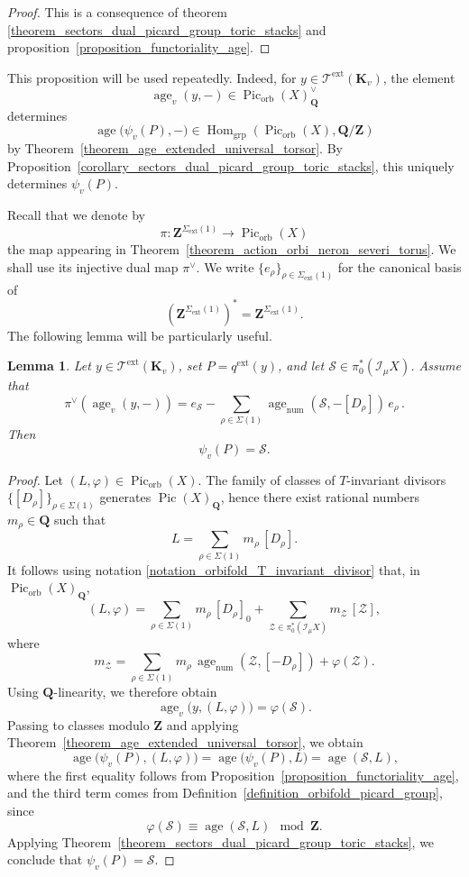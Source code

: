 \documentclass{proc-l}
\newcommand{\Z}{\mathbf{Z}}
\newcommand{\K}{\mathbf{K}}
\newcommand{\Q}{\mathbf{Q}}
\DeclareMathOperator{\Pic}{Pic}
\DeclareMathOperator{\grp}{grp}
\DeclareMathOperator{\Hom}{Hom}
\DeclareMathOperator{\num}{num}
\DeclareMathOperator{\age}{age}
\DeclareMathOperator{\orb}{orb}
\DeclareMathOperator{\ext}{ext}
\newcommand{\stackZ}{\mathcal{Z}}
\newcommand{\stackS}{\mathcal{S}}
\newcommand{\stackT}{\mathcal{T}}
\newcommand{\sheafI}{\mathcal{I}}
\newcommand{\twistsector}{\pi_0^*(\sheafI_{\mu} X)}
\newtheorem{lemma}[theorem]{Lemma}
\theoremstyle{definition}
\theoremstyle{remark}
\numberwithin{equation}{section}
\begin{document}
\begin{proof}
This is a consequence of theorem
\ref{theorem_sectors_dual_picard_group_toric_stacks} and proposition~\ref{proposition_functoriality_age}.
\end{proof}

This proposition will be used repeatedly. Indeed, for
$y \in \stackT^{\ext}(\K_v)$, the element
\[
\age_v(y,-) \in \Pic_{\orb}(X)^{\vee}_{\Q}
\]
determines
\[
\age\bigl(\psi_v(P),-\bigr) \in \Hom_{\grp}\!\left(\Pic_{\orb}(X), \Q / \Z\right)
\]
by Theorem~\ref{theorem_age_extended_universal_torsor}. By
Proposition~\ref{corollary_sectors_dual_picard_group_toric_stacks}, this uniquely
determines $\psi_v(P)$.

Recall that we denote by
\[
\pi : \Z^{\Sigma_{\ext}(1)} \longrightarrow \Pic_{\orb}(X)
\]
the map appearing in Theorem~\ref{theorem_action_orbi_neron_severi_torus}. We shall use
its injective dual map $\pi^{\vee}$. We write
$\{e_{\rho}\}_{\rho \in \Sigma_{\ext}(1)}$ for the canonical basis of
\[
(\Z^{\Sigma_{\ext}(1)})^{*} = \Z^{\Sigma_{\ext}(1)}.
\]
The following lemma will be particularly useful.

\begin{lemma}\label{lemma_computation_residue_map}
Let $y \in \stackT^{\ext}(\K_v)$, set $P = q^{\ext}(y)$, and let
$\stackS \in \twistsector$. Assume that
\[
\pi^{\vee}(\age_v(y,-))
= e_{\stackS} -
\sum_{\rho \in \Sigma(1)}
\age_{\num}\!\left(\stackS,-[D_{\rho}]\right)\, e_{\rho} \, .
\]
Then
\[
\psi_v(P) = \stackS .
\]
\end{lemma}


\begin{proof}
Let $(L,\varphi) \in \Pic_{\orb}(X)$. The family of classes of $T$-invariant divisors
$\{[D_{\rho}]\}_{\rho \in \Sigma(1)}$ generates $\Pic(X)_{\Q}$, hence there exist
rational numbers $m_{\rho} \in \Q$ such that
\[
L = \sum_{\rho \in \Sigma(1)} m_{\rho}\,[D_{\rho}].
\]
It follows using notation \ref{notation_orbifold_T_invariant_divisor} that, in $\Pic_{\orb}(X)_{\Q}$,
\[
(L,\varphi)
=
\sum_{\rho \in \Sigma(1)} m_{\rho}\,[D_{\rho}]_{0}
+
\sum_{\stackZ \in \twistsector} m_{\stackZ}\,[\stackZ],
\]
where
\[
m_{\stackZ}
=
\sum_{\rho \in \Sigma(1)}
m_{\rho}\,
\age_{\num}\!\left(\stackZ,[-D_{\rho}]\right)
+
\varphi(\stackZ).
\]
Using $\Q$-linearity, we therefore obtain
\begin{equation}\label{equation_lemma_computation_residue_map}
\age_v\bigl(y,(L,\varphi)\bigr) = \varphi(\stackS).    
\end{equation}Passing to classes modulo $\Z$ and applying
Theorem~\ref{theorem_age_extended_universal_torsor}, we obtain
\[
\age\bigl(\psi_v(P),(L,\varphi)\bigr)
=
\age\bigl(\psi_v(P),L\bigr)
=
\age(\stackS,L),
\]
where the first equality follows from Proposition~\ref{proposition_functoriality_age}, and the third term comes from
Definition~\ref{definition_orbifold_picard_group}, since
\[
\varphi(\stackS) \equiv \age(\stackS,L) \mod \Z.
\]
Applying Theorem~\ref{theorem_sectors_dual_picard_group_toric_stacks}, we conclude
that $\psi_v(P) = \stackS$.

\end{proof}
\end{document}

